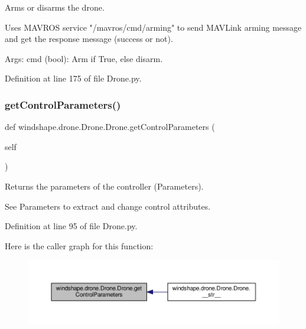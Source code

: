 \begin{DoxyVerb}Arms or disarms the drone.

Uses MAVROS service "/mavros/cmd/arming" to send MAVLink arming
message and get the response message (success or not).

Args:
    cmd (bool): Arm if True, else disarm.
\end{DoxyVerb}
 

Definition at line 175 of file Drone.\+py.

\mbox{\label{classwindshape_1_1drone_1_1_drone_1_1_drone_a255d2634547c1cd613108951b968ed6f}} 
\subsubsection{\texorpdfstring{get\+Control\+Parameters()}{getControlParameters()}}
{\footnotesize\ttfamily def windshape.\+drone.\+Drone.\+Drone.\+get\+Control\+Parameters (\begin{DoxyParamCaption}\item[{}]{self }\end{DoxyParamCaption})}

\begin{DoxyVerb}Returns the parameters of the controller (Parameters).

See Parameters to extract and change control attributes.
\end{DoxyVerb}
 

Definition at line 95 of file Drone.\+py.

Here is the caller graph for this function\+:\nopagebreak
\begin{figure}[H]
\begin{center}
\leavevmode
\includegraphics[width=350pt]{classwindshape_1_1drone_1_1_drone_1_1_drone_a255d2634547c1cd613108951b968ed6f_icgraph}
\end{center}
\end{figure}
\mbox{\label{classwindshape_1_1drone_1_1_drone_1_1_drone_ab4435f13cb1e062137c822f7b0be778a}} 
